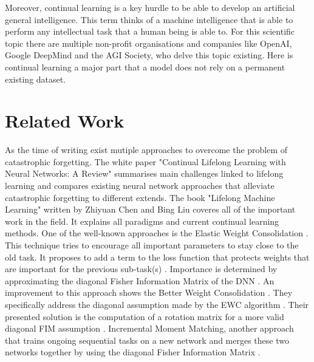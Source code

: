 Moreover, continual learning is a key hurdle to be able to develop an artificial general intelligence.
This term thinks of a machine intelligence that is able to perform any intellectual task that a human being is able to.
For this scientific topic there are multiple non-profit organisations and companies like OpenAI, Google DeepMind and the AGI Society, who delve this topic existing.
Here is continual learning a major part that a model does not rely on a permanent existing dataset.

\section{Related Work}

As the time of writing exist mutiple approaches to overcome the problem of catastrophic forgetting.
The white paper "Continual Lifelong Learning with Neural Networks: A Review" \cite{lifelong_learning_review} summarises main challenges linked to lifelong learning and compares existing neural network approaches that alleviate catastrophic forgetting to different extends.
The book "Lifelong Machine Learning" \cite{lifelong-machine-learning-book} written by Zhiyuan Chen and Bing Liu coveres all of the important work in the field.
It explains all paradigms and current continual learning methods.
\newline
One of the well-known approaches is the Elastic Weight Consolidation \cite{elastic-weight-consolidation}.
This technique tries to encourage all important parameters to stay close to the old task.
It proposes to add a term to the loss function that protects weights that are important for the previous sub-task(s) \cite{elastic-weight-consolidation}. 
Importance is determined by approximating the diagonal Fisher Information Matrix of the DNN \cite{cf_application_oriented_study, elastic-weight-consolidation}.
An improvement to this approach shows the Better Weight Consolidation \cite{better-weight-consolidation}.
They specifically address the diagonal assumption made by the EWC algorithm \cite{better-weight-consolidation}.
Their presented solution is the computation of a rotation matrix for a more valid diagonal FIM assumption \cite{better-weight-consolidation}.
\newline
Incremental Moment Matching, another approach that trains ongoing sequential tasks on a new network and merges these two networks together by using the diagonal Fisher Information Matrix \cite{incremental-moment-matching}.
